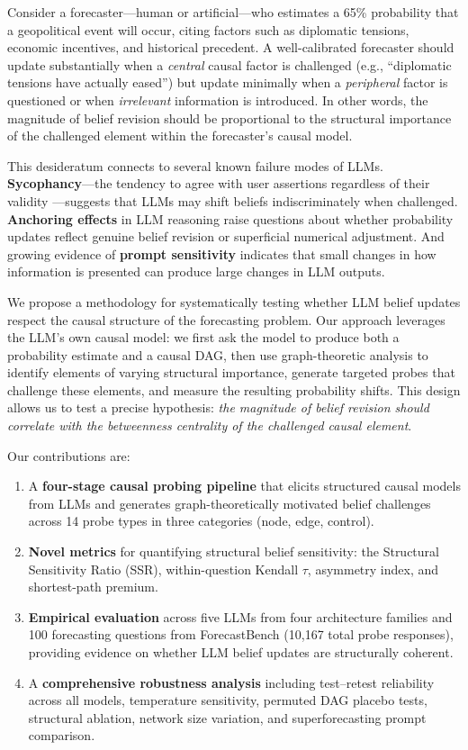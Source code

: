 \documentclass[11pt]{article}
\begin{document}
Consider a forecaster---human or artificial---who estimates a 65\% probability that a geopolitical event will occur, citing factors such as diplomatic tensions, economic incentives, and historical precedent. A well-calibrated forecaster should update substantially when a \textit{central} causal factor is challenged (e.g., ``diplomatic tensions have actually eased'') but update minimally when a \textit{peripheral} factor is questioned or when \textit{irrelevant} information is introduced. In other words, the magnitude of belief revision should be proportional to the structural importance of the challenged element within the forecaster's causal model.

This desideratum connects to several known failure modes of LLMs. \textbf{Sycophancy}---the tendency to agree with user assertions regardless of their validity \cite{sharma2024towards, cheng2025elephant}---suggests that LLMs may shift beliefs indiscriminately when challenged. \textbf{Anchoring effects} in LLM reasoning \cite{li2025anchoring, echterhoff2024anchoring} raise questions about whether probability updates reflect genuine belief revision or superficial numerical adjustment. And growing evidence of \textbf{prompt sensitivity} \cite{sclar2024quantifying, jia2024prosa} indicates that small changes in how information is presented can produce large changes in LLM outputs.

We propose a methodology for systematically testing whether LLM belief updates respect the causal structure of the forecasting problem. Our approach leverages the LLM's own causal model: we first ask the model to produce both a probability estimate and a causal DAG, then use graph-theoretic analysis to identify elements of varying structural importance, generate targeted probes that challenge these elements, and measure the resulting probability shifts. This design allows us to test a precise hypothesis: \textit{the magnitude of belief revision should correlate with the betweenness centrality of the challenged causal element}.

Our contributions are:
\begin{enumerate}
    \item A \textbf{four-stage causal probing pipeline} that elicits structured causal models from LLMs and generates graph-theoretically motivated belief challenges across 14 probe types in three categories (node, edge, control).
    \item \textbf{Novel metrics} for quantifying structural belief sensitivity: the Structural Sensitivity Ratio (SSR), within-question Kendall $\tau$, asymmetry index, and shortest-path premium.
    \item \textbf{Empirical evaluation} across five LLMs from four architecture families and 100 forecasting questions from ForecastBench (10,167 total probe responses), providing evidence on whether LLM belief updates are structurally coherent.
    \item A \textbf{comprehensive robustness analysis} including test--retest reliability across all models, temperature sensitivity, permuted DAG placebo tests, structural ablation, network size variation, and superforecasting prompt comparison.
\end{enumerate}
\end{document}
